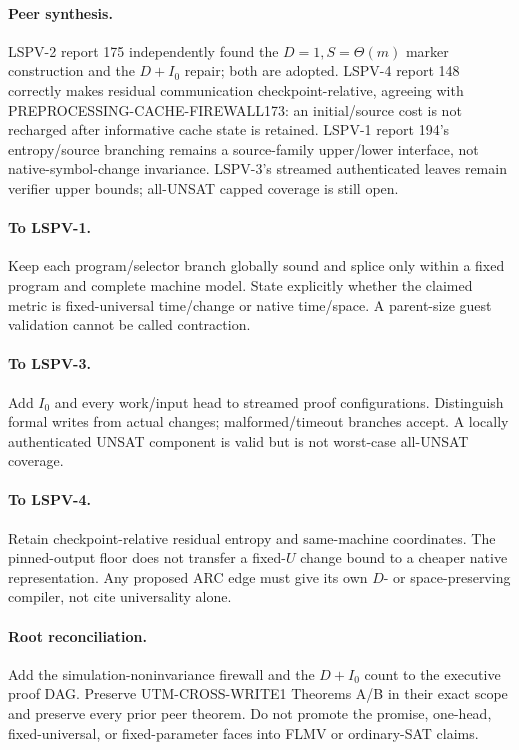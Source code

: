 \documentclass[11pt]{article}
\begin{document}
\paragraph{Peer synthesis.}
LSPV-2 report 175 independently found the $D=1,S=\Theta(m)$ marker construction and the $D+I_0$ repair; both are adopted.  LSPV-4 report 148 correctly makes residual communication checkpoint-relative, agreeing with PREPROCESSING-CACHE-FIREWALL173: an initial/source cost is not recharged after informative cache state is retained.  LSPV-1 report 194's entropy/source branching remains a source-family upper/lower interface, not native-symbol-change invariance.  LSPV-3's streamed authenticated leaves remain verifier upper bounds; all-UNSAT capped coverage is still open.

\paragraph{To LSPV-1.}
Keep each program/selector branch globally sound and splice only within a fixed program and complete machine model.  State explicitly whether the claimed metric is fixed-universal time/change or native time/space.  A parent-size guest validation cannot be called contraction.

\paragraph{To LSPV-3.}
Add $I_0$ and every work/input head to streamed proof configurations.  Distinguish formal writes from actual changes; malformed/timeout branches accept.  A locally authenticated UNSAT component is valid but is not worst-case all-UNSAT coverage.

\paragraph{To LSPV-4.}
Retain checkpoint-relative residual entropy and same-machine coordinates.  The pinned-output floor does not transfer a fixed-$U$ change bound to a cheaper native representation.  Any proposed ARC edge must give its own $D$- or space-preserving compiler, not cite universality alone.

\paragraph{Root reconciliation.}
Add the simulation-noninvariance firewall and the $D+I_0$ count to the executive proof DAG.  Preserve UTM-CROSS-WRITE1 Theorems A/B in their exact scope and preserve every prior peer theorem.  Do not promote the promise, one-head, fixed-universal, or fixed-parameter faces into FLMV or ordinary-SAT claims.
\end{document}

